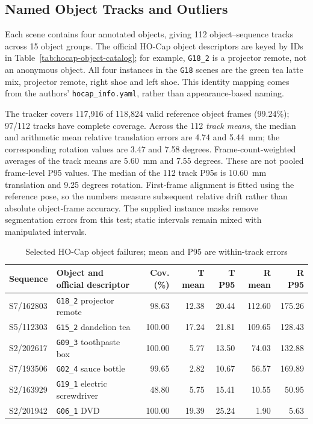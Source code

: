 \subsection{Named Object Tracks and Outliers}

Each scene contains four annotated objects, giving 112 object--sequence
tracks across 15 object groups. The official HO-Cap object descriptors
\cite{hocap-catalog} are keyed by IDs in Table~\ref{tab:hocap-object-catalog};
for example, \texttt{G18\_2} is a projector remote, not an anonymous
object. All four instances in the \texttt{G18} scenes are the green tea
latte mix, projector remote, right shoe and left shoe. This identity
mapping comes from the authors' \texttt{hocap\_info.yaml}, rather than
appearance-based naming.

The tracker covers 117,916 of 118,824 valid reference object frames
(99.24\%); 97/112 tracks have complete coverage. Across the 112
\emph{track means}, the median and arithmetic mean relative translation
errors are 4.74 and 5.44~mm; the corresponding rotation values are
3.47 and 7.58 degrees. Frame-count-weighted averages of the track means
are 5.60~mm and 7.55 degrees. These are not pooled frame-level P95
values. The median of the 112 track P95s is 10.60~mm translation and
9.25 degrees rotation. First-frame alignment is fitted using the
reference pose, so the numbers measure subsequent relative drift rather
than absolute object-frame accuracy. The supplied instance masks
remove segmentation errors from this test; static intervals remain mixed
with manipulated intervals.

\begin{table}[htbp]
\caption{Selected HO-Cap object failures; mean and P95 are within-track errors}
\label{tab:hocap-object-outliers}
\centering\scriptsize
\begin{tabular}{llrrrrr}
\toprule
Sequence & Object and official descriptor & Cov. (\%) & T mean & T P95 & R mean & R P95 \\
\midrule
S7/162803 & \texttt{G18\_2} projector remote & 98.63 & 12.38 & 20.44 & 112.60 & 175.26 \\
S5/112303 & \texttt{G15\_2} dandelion tea & 100.00 & 17.24 & 21.81 & 109.65 & 128.43 \\
S2/202617 & \texttt{G09\_3} toothpaste box & 100.00 & 5.77 & 13.50 & 74.03 & 132.88 \\
S7/193506 & \texttt{G02\_4} sauce bottle & 99.65 & 2.82 & 10.67 & 56.57 & 169.89 \\
S2/163929 & \texttt{G19\_1} electric screwdriver & 48.80 & 5.75 & 15.41 & 10.55 & 50.95 \\
S2/201942 & \texttt{G06\_1} DVD & 100.00 & 19.39 & 25.24 & 1.90 & 5.63 \\
\bottomrule
\end{tabular}
\end{table}


